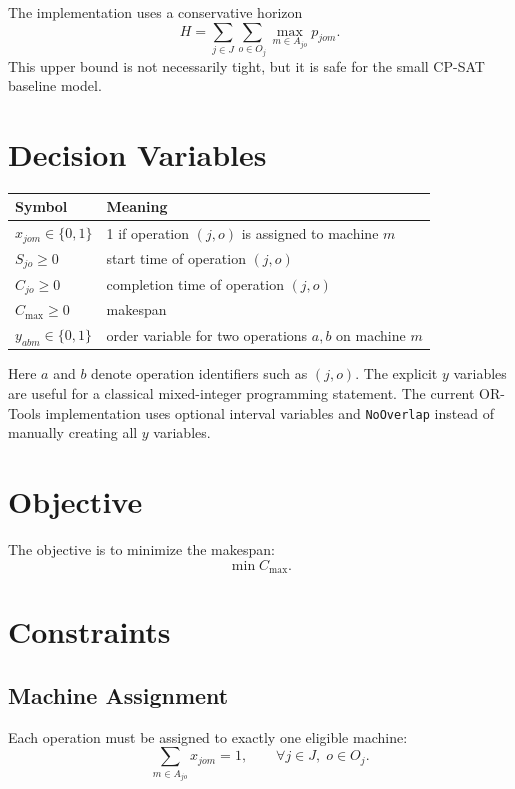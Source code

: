 ﻿\documentclass[11pt]{article}
\begin{document}
The implementation uses a conservative horizon
\[
H = \sum_{j \in J} \sum_{o \in O_j} \max_{m \in A_{jo}} p_{jom}.
\]
This upper bound is not necessarily tight, but it is safe for the small
CP-SAT baseline model.

\section{Decision Variables}

\begin{table}[h]
\centering
\begin{tabular}{ll}
\toprule
Symbol & Meaning \\
\midrule
$x_{jom} \in \{0,1\}$ & 1 if operation $(j,o)$ is assigned to machine $m$ \\
$S_{jo} \ge 0$ & start time of operation $(j,o)$ \\
$C_{jo} \ge 0$ & completion time of operation $(j,o)$ \\
$C_{\max} \ge 0$ & makespan \\
$y_{abm} \in \{0,1\}$ & order variable for two operations $a,b$ on machine $m$ \\
\bottomrule
\end{tabular}
\end{table}

Here $a$ and $b$ denote operation identifiers such as $(j,o)$. The explicit
$y$ variables are useful for a classical mixed-integer programming statement.
The current OR-Tools implementation uses optional interval variables and
\texttt{NoOverlap} instead of manually creating all $y$ variables.

\section{Objective}

The objective is to minimize the makespan:
\[
\min C_{\max}.
\]

\section{Constraints}

\subsection{Machine Assignment}

Each operation must be assigned to exactly one eligible machine:
\[
\sum_{m \in A_{jo}} x_{jom} = 1,
\qquad \forall j \in J,\; o \in O_j.
\]
\end{document}
